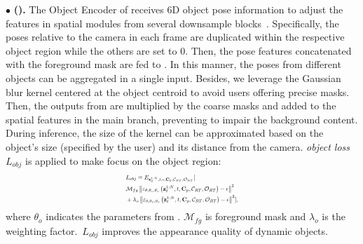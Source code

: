 \noindent$\bullet$
\textbf{\objctrlcompletename (\objctrlname).} The Object Encoder of \objctrlname receives 6D object pose information to adjust the features in spatial modules from several downsample blocks~\cite{StableDiffusion,MotionCtrl}. Specifically, the poses relative to the camera in each frame are duplicated within the respective object region while the others are set to 0. Then, the pose features concatenated with the foreground mask are fed to \objctrlname. In this manner, the poses from different objects can be aggregated in a single input. Besides, we leverage the Gaussian blur kernel centered at the object centroid to avoid users offering precise masks. Then, the outputs from \objctrlname are multiplied by the coarse masks and added to the spatial features in the main branch, preventing to impair the background content. During inference, the size of the kernel can be approximated based on the object's size (specified by the user) and its distance from the camera. \textit{object loss} $L_{obj}$ is applied to make \objctrlname focus on the object region:
\vspace{-1.6mm}\begin{equation}\vspace{-1mm}
\resizebox{0.332\textwidth}{!}{$
\begin{aligned}\label{eq:obj-ddpm-loss}
&L_{obj}=E_{\mathbf{z}_0^{1:N},t,\epsilon,\mathbf{C}_p,\mathcal{C}_{RT},\mathcal{O}_{RT}}[ \\
&\mathcal{M}_{fg}\left\|\varepsilon_{\theta,\theta_c,\theta_o}\left(\mathbf{z}^{1:N}_t, t, \mathbf{C}_p,\mathcal{C}_{RT},\mathcal{O}_{RT}\right)-\epsilon\right\|^2  \\
&+\lambda_o \left\|\varepsilon_{\theta,\theta_c,\theta_o}\left(\mathbf{z}^{1:N}_t, t, \mathbf{C}_p,\mathcal{C}_{RT},\mathcal{O}_{RT}\right)-\epsilon\right\|^2 ],
\end{aligned}
$}
\end{equation}
where $\theta_o$ indicates the parameters from \objctrlname. $\mathcal{M}_{fg}$ is foreground mask and $\lambda_o$ is the weighting factor.~$L_{obj}$ improves the appearance quality of dynamic objects. 







